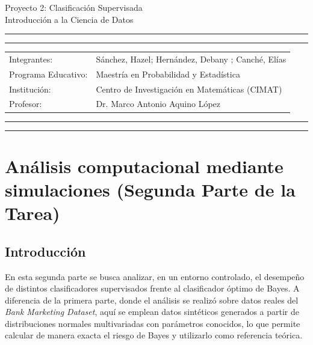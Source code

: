 \documentclass[10pt]{article}
\newcommand{\studentname}{Sánchez, Hazel; Hernández, Debany ; Canché, Elías}
\newcommand{\researchcentre}{Maestría en Probabilidad y Estadística}
\newcommand{\institution}{Centro de Investigación en Matemáticas (CIMAT)}
\newcommand{\supervisor}{Dr. Marco Antonio Aquino López}
\begin{document}
\begin{center}
{\Large{Proyecto 2: Clasificación Supervisada}} \\
\vspace{2mm}
{\Large{Introducción a la Ciencia de Datos}} \\
\end{center}

\vspace{5mm}
\hrule
\vspace{1mm}
\hrule

\vspace{3mm}
\begin{tabular}{ll} 
Integrantes:           	        & {\studentname}   \\ 
Programa Educativo: 	        & {\researchcentre}  \\ 
Institución:                 & {\institution}  \\
Profesor: 	                 & {\supervisor}  \\ 
\end{tabular}

\vspace{3mm}
\hrule
\vspace{1mm}
\hrule

\begin{abstract}

\end{abstract}
\section{Análisis computacional mediante simulaciones (Segunda Parte de la Tarea)}

\subsection*{Introducción}


En esta segunda parte se busca analizar, en un entorno controlado, el desempeño de distintos clasificadores supervisados frente al clasificador óptimo de Bayes. A diferencia de la primera parte, donde el análisis se realizó sobre datos reales del \textit{Bank Marketing Dataset}, aquí se emplean datos sintéticos generados a partir de distribuciones normales multivariadas con parámetros conocidos, lo que permite calcular de manera exacta el riesgo de Bayes y utilizarlo como referencia teórica.
\end{document}
